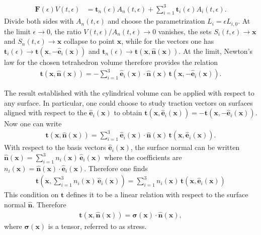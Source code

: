 \begin{example}
    \begin{align*}
        \bm{F}(\epsilon) V(t,\epsilon)&=\bm{t}_n(\epsilon)A_n(t,\epsilon)+\sum_{i=1}^3\bm{t}_i(\epsilon)A_i(t,\epsilon).
    \end{align*} 
    Divide both sides with $A_n(t,\epsilon)$ and choose the parametrization $L_i=\epsilon L_{i,0}$. At the limit $\epsilon\to 0$, the ratio $V(t,\epsilon)/A_n(t,\epsilon)\to 0$ vanishes, the sets $S_i(t,\epsilon)\to\bm{x}$ and $S_n(t,\epsilon)\to\bm{x}$ collapse to point $\bm{x}$, while for the vectors one has $\bm{t}_i(\epsilon)\to \bm{t}(\bm{x},-\bm{\hat{e}}_i(\bm{x}))$ and $\bm{t}_n(\epsilon)\to\bm{t}(\bm{x},\bm{\hat{n}}(\bm{x}))$. At the limit, Newton's law for the chosen tetrahedron volume therefore provides the relation
    \begin{align*}
        \bm{t}(\bm{x},\bm{\hat{n}}(\bm{x}))=-\sum_{i=1}^3\bm{\hat{e}}_i(\bm{x})\cdot\bm{\hat{n}}(\bm{x}) \,\bm{t}(\bm{x},-\bm{\hat{e}}_i(\bm{x})).
    \end{align*}
    
    The result established with the cylindrical volume can be applied with respect to any surface. In particular, one could choose to study traction vectors on surfaces aligned with respect to the $\bm{\hat{e}}_i(\bm{x})$ to obtain $\bm{t}(\bm{x},\bm{\hat{e}}_i(\bm{x}))=-\bm{t}(\bm{x},-\bm{\hat{e}}_i(\bm{x}))$. Now one can write
    \begin{align*}
        \bm{t}(\bm{x},\bm{\hat{n}}(\bm{x}))=\sum_{i=1}^3\bm{\hat{e}}_i(\bm{x})\cdot\bm{\hat{n}}(\bm{x}) \,\bm{t}(\bm{x},\bm{\hat{e}}_i(\bm{x})).
    \end{align*}
    With respect to the basis vectors $\bm{\hat{e}}_i(\bm{x})$, the surface normal can be written $\bm{\hat{n}}(\bm{x})=\sum_{i=1}^3n_i(\bm{x})\,\bm{\hat{e}}_i(\bm{x})$ where the coefficients are $n_i(\bm{x})=\bm{\hat{n}}(\bm{x})\cdot\bm{\hat{e}}_i(\bm{x})$. Therefore
    one finds
    \begin{align*}
        \bm{t}\left(\bm{x},\sum_{i=1}^3n_i(\bm{x})\,\bm{\hat{e}}_i(\bm{x})\right)=\sum_{i=1}^3n_i(\bm{x})\,\bm{t}(\bm{x},\bm{\hat{e}}_i(\bm{x}))
    \end{align*}
    This condition on $\bm{t}$ defines it to be a linear relation with respect to the surface normal $\bm{\hat{n}}$. Therefore
    \begin{align*}
        \bm{t}(\bm{x},\bm{\hat{n}}(\bm{x}))=\bm{\sigma}(\bm{x})\cdot\bm{\hat{n}}(\bm{x}),
    \end{align*}
    where $\bm{\sigma}(\bm{x})$ is a tensor, referred to as stress.
\end{example}

